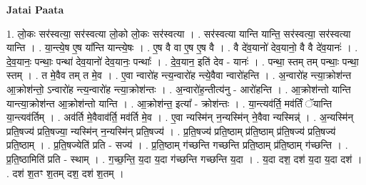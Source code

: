 \documentclass[17pt]{extarticle}
\begin{document}
\textbf{Jatai Paata} \newline

1. लो॒कः सर॑स्वत्या॒ सर॑स्वत्या लो॒को लो॒कः सर॑स्वत्या । . सर॑स्वत्या यान्ति यान्ति॒ सर॑स्वत्या॒ सर॑स्वत्या यान्ति । . या॒न्त्ये॒ष ए॒ष या᳚न्ति यान्त्ये॒षः । . ए॒ष वै वा ए॒ष ए॒ष वै । . वै दे॑व॒यानो॑ देव॒यानो॒ वै वै दे॑व॒यानः॑ । . दे॒व॒यानः॒ पन्थाः॒ पन्था॑ देव॒यानो॑ देव॒यानः॒ पन्थाः᳚ । . दे॒व॒यान॒ इति॑ देव - यानः॑ । . पन्था॒ स्तम् तम् पन्थाः॒ पन्था॒ स्तम् । . त मे॒वैव तम् त मे॒व । . ए॒वा न्वारो॑ह न्त्य॒न्वारो॑ह न्त्ये॒वैवा न्वारो॑हन्ति । . अ॒न्वारो॑ह न्त्या॒क्रोश॑न्त आ॒क्रोश॑न्तो॒ ऽन्वारो॑ह न्त्य॒न्वारो॑ह न्त्या॒क्रोश॑न्तः । . अ॒न्वारो॑ह॒न्तीत्य॑नु - आरो॑हन्ति । . आ॒क्रोश॑न्तो यान्ति यान्त्या॒क्रोश॑न्त आ॒क्रोश॑न्तो यान्ति । . आ॒क्रोश॑न्त॒ इत्या᳚ - क्रोश॑न्तः । . या॒न्त्यव॑र्ति॒ मव॑र्तिं ॅयान्ति या॒न्त्यव॑र्तिम् । . अव॑र्ति मे॒वैवाव॑र्ति॒ मव॑र्ति मे॒व । . ए॒वा न्यस्मि॑न् न॒न्यस्मि॑न् ने॒वैवा न्यस्मिन्न्॑ । . अ॒न्यस्मि॑न् प्रति॒षज्य॑ प्रति॒षज्या॒ न्यस्मि॑न् न॒न्यस्मि॑न् प्रति॒षज्य॑ । . प्र॒ति॒षज्य॑ प्रति॒ष्ठाम् प्र॑ति॒ष्ठाम् प्र॑ति॒षज्य॑ प्रति॒षज्य॑ प्रति॒ष्ठाम् । . प्र॒ति॒षज्येति॑ प्रति - सज्य॑ । . प्र॒ति॒ष्ठाम् ग॑च्छन्ति गच्छन्ति प्रति॒ष्ठाम् प्र॑ति॒ष्ठाम् ग॑च्छन्ति । . प्र॒ति॒ष्ठामिति॑ प्रति - स्थाम् । . ग॒च्छ॒न्ति॒ य॒दा य॒दा ग॑च्छन्ति गच्छन्ति य॒दा । . य॒दा दश॒ दश॑ य॒दा य॒दा दश॑ । . दश॑ श॒तꣳ श॒तम् दश॒ दश॑ श॒तम् । \newline
\end{document}
